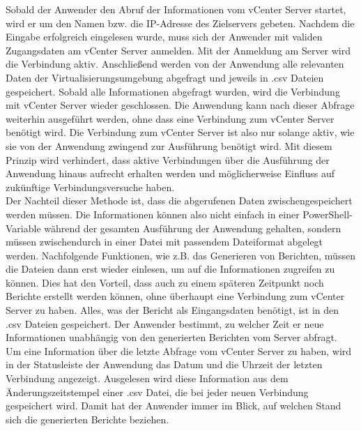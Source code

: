 Sobald der Anwender den Abruf der Informationen vom vCenter Server startet, wird er um den Namen bzw. die IP-Adresse des Zielservers gebeten. Nachdem die Eingabe erfolgreich eingelesen wurde, muss sich der Anwender mit validen Zugangsdaten am vCenter Server anmelden. Mit der Anmeldung am Server wird die Verbindung aktiv. Anschließend werden von der Anwendung alle relevanten Daten der Virtualisierungsumgebung abgefragt und jeweils in .csv Dateien gespeichert. Sobald alle Informationen abgefragt wurden, wird die Verbindung mit vCenter Server wieder geschlossen. Die Anwendung kann nach dieser Abfrage weiterhin ausgeführt werden, ohne dass eine Verbindung zum vCenter Server benötigt wird. Die Verbindung zum vCenter Server ist also nur solange aktiv, wie sie von der Anwendung zwingend zur Ausführung benötigt wird. Mit diesem Prinzip wird verhindert, dass aktive Verbindungen über die Ausführung der Anwendung hinaus aufrecht erhalten werden und möglicherweise Einfluss auf zukünftige Verbindungsversuche haben.\medskip\\Der Nachteil dieser Methode ist, dass die abgerufenen Daten zwischengespeichert werden müssen. Die Informationen können also nicht einfach in einer PowerShell-Variable während der gesamten Ausführung der Anwendung gehalten, sondern müssen zwischendurch in einer Datei mit passendem Dateiformat abgelegt werden. Nachfolgende Funktionen, wie z.B. das Generieren von Berichten, müssen die Dateien dann erst wieder einlesen, um auf die Informationen zugreifen zu können. Dies hat den Vorteil, dass auch zu einem späteren Zeitpunkt noch Berichte erstellt werden können, ohne überhaupt eine Verbindung zum vCenter Server zu haben. Alles, was der Bericht als Eingangsdaten benötigt, ist in den .csv Dateien gespeichert. Der Anwender bestimmt, zu welcher Zeit er neue Informationen unabhängig von den generierten Berichten vom Server abfragt.\\Um eine Information über die letzte Abfrage vom vCenter Server zu haben, wird in der Statusleiste der Anwendung das Datum und die Uhrzeit der letzten Verbindung angezeigt. Ausgelesen wird diese Information aus dem Änderungszeitstempel einer .csv Datei, die bei jeder neuen Verbindung gespeichert wird. Damit hat der Anwender immer im Blick, %
auf welchen Stand sich die generierten Berichte beziehen.
\newpage
